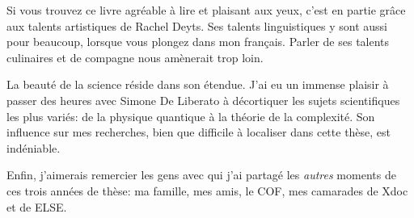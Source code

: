 Si vous trouvez ce livre agréable à lire et plaisant aux yeux, c'est
en partie grâce aux talents artistiques de Rachel Deyts. Ses talents
linguistiques y sont aussi pour beaucoup, lorsque vous plongez dans
mon français. Parler de ses talents culinaires et de compagne nous
amènerait trop loin.

La beauté de la science réside dans son étendue. J'ai eu un immense
plaisir à passer des heures avec Simone De Liberato à décortiquer les
sujets scientifiques les plus variés: de la physique quantique à la
théorie de la complexité. Son influence sur mes recherches, bien que
difficile à localiser dans cette thèse, est indéniable.

Enfin, j'aimerais remercier les gens avec qui j'ai partagé les
\emph{autres} moments de ces trois années de thèse: ma famille, mes
amis, le COF, mes camarades de Xdoc et de ELSE.



